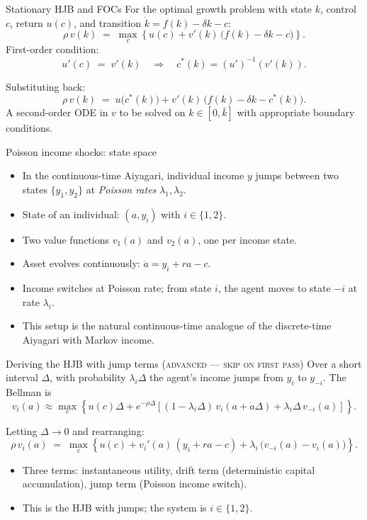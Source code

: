 \begin{frame}{Stationary HJB and FOCs}
For the optimal growth problem with state $k$, control $c$, return $u(c)$, and transition $\dot k = f(k) - \delta k - c$:
\[
\rho\, v(k) \;=\; \max_c\!\left\{u(c) + v'(k)\,\big(f(k)-\delta k - c\big)\right\}.
\]
\medskip
First-order condition:
\[
u'(c) \;=\; v'(k) \quad\Longrightarrow\quad c^*(k) = (u')^{-1}(v'(k)).
\]
\medskip

Substituting back:
\[
\rho\, v(k) \;=\; u\!\big(c^*(k)\big) + v'(k)\,\big(f(k) - \delta k - c^*(k)\big).
\]
\medskip
A second-order ODE in $v$ to be solved on $k \in [0, \bar k]$ with appropriate boundary conditions.
\end{frame}

\begin{frame}{Poisson income shocks: state space}
\begin{itemize}
\item In the continuous-time Aiyagari, individual income $y$ jumps between two states $\{y_1, y_2\}$ at \emph{Poisson rates} $\lambda_1, \lambda_2$.
\medskip
\item State of an individual: $(a, y_i)$ with $i \in \{1,2\}$.
\medskip
\item Two value functions $v_1(a)$ and $v_2(a)$, one per income state.
\medskip
\item Asset evolves continuously: $\dot a = y_i + r a - c$.
\medskip
\item Income switches at Poisson rate; from state $i$, the agent moves to state $-i$ at rate $\lambda_i$.
\medskip
\item This setup is the natural continuous-time analogue of the discrete-time Aiyagari with Markov income.
\end{itemize}
\end{frame}

\begin{frame}{Deriving the HJB with jump terms \textsc{(advanced --- skip on first pass)}}
Over a short interval $\Delta$, with probability $\lambda_i \Delta$ the agent's income jumps from $y_i$ to $y_{-i}$. The Bellman is
\[
v_i(a) \approx \max_c\!\left\{u(c)\Delta + e^{-\rho\Delta}\!\left[(1-\lambda_i\Delta)\, v_i(a + \dot a\Delta) + \lambda_i\Delta\, v_{-i}(a)\right]\right\}.
\]
\medskip

Letting $\Delta \to 0$ and rearranging:
\[
\rho\, v_i(a) \;=\; \max_c\!\left\{u(c) + v_i'(a)\,(y_i + r a - c) + \lambda_i\,\big(v_{-i}(a) - v_i(a)\big)\right\}.
\]
\medskip
\begin{itemize}
\item Three terms: instantaneous utility, drift term (deterministic capital accumulation), jump term (Poisson income switch).
\item This is the HJB with jumps; the system is $i \in \{1,2\}$.
\end{itemize}
\end{frame}

